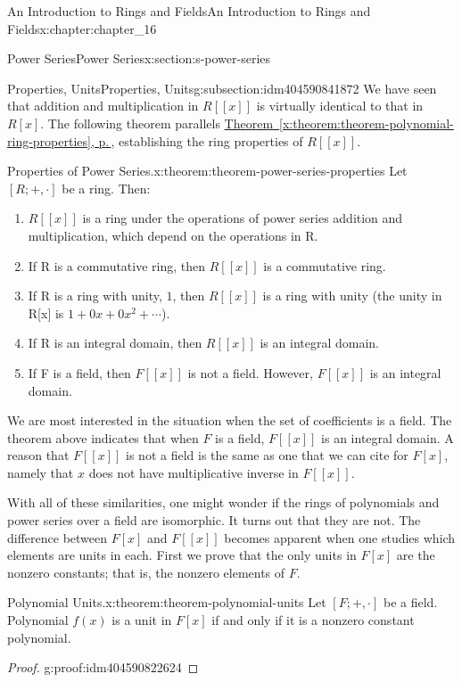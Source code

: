 \documentclass[twoside,10pt,]{book}
\newcommand{\xreffont}{\relax}
\numberwithin{equation}{section}
\begin{document}
\begin{chapterptx}{An Introduction to Rings and Fields}{}{An Introduction to Rings and Fields}{}{}{x:chapter:chapter_16}
\begin{sectionptx}{Power Series}{}{Power Series}{}{}{x:section:s-power-series}
\begin{subsectionptx}{Properties, Units}{}{Properties, Units}{}{}{g:subsection:idm404590841872}
We have seen that addition and multiplication in \(R[[x]]\) is virtually identical to that in \(R[x]\). The following theorem parallels \hyperref[x:theorem:theorem-polynomial-ring-properties]{Theorem~{\xreffont\ref{x:theorem:theorem-polynomial-ring-properties}}, p.\,\pageref{x:theorem:theorem-polynomial-ring-properties}}, establishing the ring properties of \(R[[x]]\).%
\begin{theorem}{Properties of Power Series.}{}{x:theorem:theorem-power-series-properties}%
Let \([R; +, \cdot ]\) be a ring. Then:%
\begin{enumerate}[label=(\arabic*)]
\item{}\(R[[x]]\) is a ring under the operations of power series addition and multiplication, which depend on  the operations in R.%
\item{}If R is a commutative ring, then \(R[[x]]\) is a commutative ring.%
\item{}If R is a ring with unity, \(1\), then \(R[[x]]\) is a ring with unity (the unity in R[x] is \(1 + 0x + 0 x^2 + \cdots\)).%
\item{}If R is an integral domain, then \(R[[x]]\) is an integral domain.%
\item{}If F is a field, then \(F[[x]]\) is not a field. However, \(F[[x]]\) is an integral domain.%
\end{enumerate}
%
\end{theorem}
We are most interested in the situation when the set of coefficients is a field. The theorem above indicates that when \(F\) is a field, \(F[[x]]\) is an integral domain. A reason that \(F[[x]]\) is not a field is the same as one that we can cite for \(F[x]\), namely that \(x\) does not have multiplicative inverse in \(F[[x]]\).%
\par
With all of these similarities, one might wonder if the rings of polynomials and power series over a field are isomorphic.  It turns out that they are not. The difference between \(F[x]\) and \(F[[x]]\) becomes apparent when one studies which elements are units in each. First we prove that the only units in \(F[x]\) are the nonzero constants; that is, the nonzero elements of \(F\).%
\begin{theorem}{Polynomial Units.}{}{x:theorem:theorem-polynomial-units}%
%
%
Let \([F; +, \cdot ]\) be a field. Polynomial \(f(x)\) is a unit in \(F[x]\) if and only if it is a nonzero constant polynomial.%
\end{theorem}
\begin{proof}{}{g:proof:idm404590822624}

\end{proof}
\end{subsectionptx}
\end{sectionptx}
\end{chapterptx}
\end{document}
